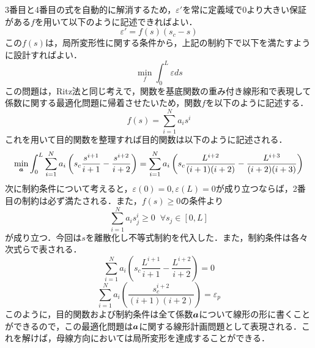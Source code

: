 \documentclass[16.7pt]{jsarticle}
\begin{document}
		3番目と4番目の式を自動的に解消するため，$ \varepsilon' $を常に定義域で$ 0 $より大きい保証がある$ f $を用いて以下のように記述できればよい．
		\begin{equation}\label{eq:ver_Sdot_eq}
			\varepsilon' = f(s)(s_c -s)%
		\end{equation}
		この$ f(s) $は，局所変形性に関する条件から，上記の制約下で以下を満たすように設計すればよい．
		\begin{equation}\label{eq:var_st_min}
			\min_{f} \int_{0}^L \varepsilon ds
		\end{equation}
		この問題は，Ritz法と同じ考えで，関数を基底関数の重み付き線形和で表現して係数に関する最適化問題に帰着させたいため，関数$ f $を以下のように記述する．
		\begin{equation}\label{eq:func_bd_a}
			f(s) = \sum_{i=1}^N a_i s^i 
		\end{equation}
		これを用いて目的関数を整理すれば目的関数は以下のように記述される．
		\begin{equation}\label{eq:objfunc_min}
			\min_{\boldsymbol{a}} \int_{0}^{L} \sum_{i=1}^N a_i \left(s_c \frac{s^{i+1}}{i+1} - \frac{s^{i+2}}{i+2} \right)= \sum_{i=1}^N a_i \left(s_c \frac{L^{i+2}}{(i+1)(i+2)} - \frac{L^{i+3}}{(i+2)(i+3)} \right)
		\end{equation}
		次に制約条件について考えると，$ \varepsilon(0)=0 ,\varepsilon(L)=0$が成り立つならば，2番目の制約は必ず満たされる．また，$ f(s)\geq 0 $の条件より
		\begin{equation}\label{eq:ineq_eq}
			\sum_{i=1}^N a_i s_j^i \geq 0 \;\; \forall s_j \in [0,L] 
		\end{equation}
		が成り立つ．今回は$ s $を離散化し不等式制約を代入した．また，制約条件は各々次式らで表される．
		\begin{equation}\label{eq:amend_cond_1}
			\sum_{i=1}^N a_i \left(s_c \frac{L^{i+1}}{i+1} - \frac{L^{i+2}}{i+2} \right) = 0
		\end{equation}
		\begin{equation}\label{eq:amend_cond_2}
			\sum_{i=1}^N a_i \left(\frac{s_c^{i+2}}{(i+1)(i+2)}\right) = \varepsilon_p
		\end{equation}
		このように，目的関数および制約条件は全て係数$ \boldsymbol{a} $について線形の形に書くことができるので，この最適化問題は$ \boldsymbol{a} $に関する線形計画問題として表現される．これを解けば，母線方向においては局所変形を達成することができる．
		
\end{document}
